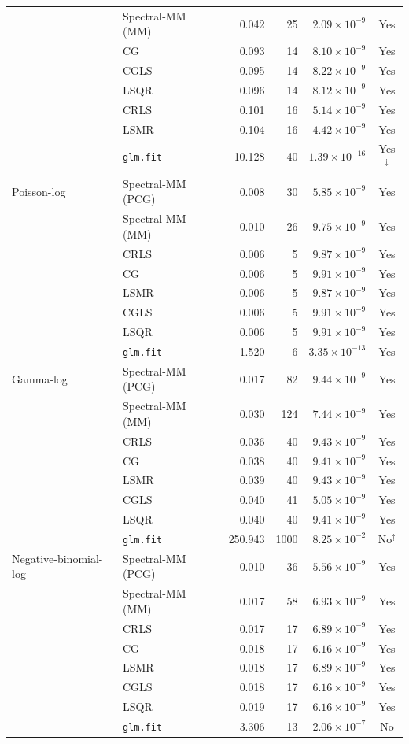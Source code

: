 \begin{longtable}{llrrrc}
 & Spectral-MM (MM) & 0.042 & 25 & $2.09\times10^{-9}$ & Yes \\
 & CG & 0.093 & 14 & $8.10\times10^{-9}$ & Yes \\
 & CGLS & 0.095 & 14 & $8.22\times10^{-9}$ & Yes \\
 & LSQR & 0.096 & 14 & $8.12\times10^{-9}$ & Yes \\
 & CRLS & 0.101 & 16 & $5.14\times10^{-9}$ & Yes \\
 & LSMR & 0.104 & 16 & $4.42\times10^{-9}$ & Yes \\
 & \texttt{glm.fit} & 10.128 & 40 & $1.39\times10^{-16}$ & Yes$^{\ddagger}$ \\
\midrule
Poisson-log & Spectral-MM (PCG) & 0.008 & 30 & $5.85\times10^{-9}$ & Yes \\
 & Spectral-MM (MM) & 0.010 & 26 & $9.75\times10^{-9}$ & Yes \\
 & CRLS & 0.006 & 5 & $9.87\times10^{-9}$ & Yes \\
 & CG & 0.006 & 5 & $9.91\times10^{-9}$ & Yes \\
 & LSMR & 0.006 & 5 & $9.87\times10^{-9}$ & Yes \\
 & CGLS & 0.006 & 5 & $9.91\times10^{-9}$ & Yes \\
 & LSQR & 0.006 & 5 & $9.91\times10^{-9}$ & Yes \\
 & \texttt{glm.fit} & 1.520 & 6 & $3.35\times10^{-13}$ & Yes \\
\midrule
Gamma-log & Spectral-MM (PCG) & 0.017 & 82 & $9.44\times10^{-9}$ & Yes \\
 & Spectral-MM (MM) & 0.030 & 124 & $7.44\times10^{-9}$ & Yes \\
 & CRLS & 0.036 & 40 & $9.43\times10^{-9}$ & Yes \\
 & CG & 0.038 & 40 & $9.41\times10^{-9}$ & Yes \\
 & LSMR & 0.039 & 40 & $9.43\times10^{-9}$ & Yes \\
 & CGLS & 0.040 & 41 & $5.05\times10^{-9}$ & Yes \\
 & LSQR & 0.040 & 40 & $9.41\times10^{-9}$ & Yes \\
 & \texttt{glm.fit} & 250.943 & 1000 & $8.25\times10^{-2}$ & No$^{\ddagger}$ \\
\midrule
Negative-binomial-log & Spectral-MM (PCG) & 0.010 & 36 & $5.56\times10^{-9}$ & Yes \\
 & Spectral-MM (MM) & 0.017 & 58 & $6.93\times10^{-9}$ & Yes \\
 & CRLS & 0.017 & 17 & $6.89\times10^{-9}$ & Yes \\
 & CG & 0.018 & 17 & $6.16\times10^{-9}$ & Yes \\
 & LSMR & 0.018 & 17 & $6.89\times10^{-9}$ & Yes \\
 & CGLS & 0.018 & 17 & $6.16\times10^{-9}$ & Yes \\
 & LSQR & 0.019 & 17 & $6.16\times10^{-9}$ & Yes \\
 & \texttt{glm.fit} & 3.306 & 13 & $2.06\times10^{-7}$ & No \\
\end{longtable}
